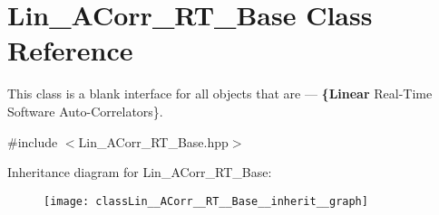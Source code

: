\hypertarget{classLin__ACorr__RT__Base}{}\section{Lin\+\_\+\+A\+Corr\+\_\+\+R\+T\+\_\+\+Base Class Reference}
\label{classLin__ACorr__RT__Base}


This class is a blank interface for all objects that are — {\bfseries \{Linear} Real-\/\+Time Software Auto-\/\+Correlators\}.  




{\ttfamily \#include $<$Lin\+\_\+\+A\+Corr\+\_\+\+R\+T\+\_\+\+Base.\+hpp$>$}



Inheritance diagram for Lin\+\_\+\+A\+Corr\+\_\+\+R\+T\+\_\+\+Base\+:
\nopagebreak
\begin{figure}[H]
\begin{center}
\leavevmode
\texttt{[image: classLin\_\_ACorr\_\_RT\_\_Base\_\_inherit\_\_graph]}
\end{center}
\end{figure}
